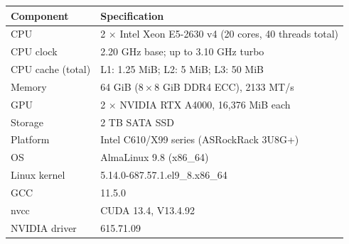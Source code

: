 \small
\renewcommand{\arraystretch}{1.15}
\begin{tabular}{@{}ll@{}}
\toprule
Component & Specification \\
\midrule
CPU & 2 $\times$ Intel Xeon E5-2630 v4 (20 cores, 40 threads total) \\
CPU clock & 2.20 GHz base; up to 3.10 GHz turbo \\
CPU cache (total) & L1: 1.25 MiB; L2: 5 MiB; L3: 50 MiB \\
Memory & 64 GiB ($8 \times 8$ GiB DDR4 ECC), 2133 MT/s \\
GPU & 2 $\times$ NVIDIA RTX A4000, 16,376 MiB each \\
Storage & 2 TB SATA SSD \\
Platform & Intel C610/X99 series (ASRockRack 3U8G+) \\
OS & AlmaLinux 9.8 (x86\_64) \\
Linux kernel & 5.14.0-687.57.1.el9\_8.x86\_64 \\
GCC & 11.5.0 \\
nvcc & CUDA 13.4, V13.4.92 \\
NVIDIA driver & 615.71.09 \\
\bottomrule
\end{tabular}
